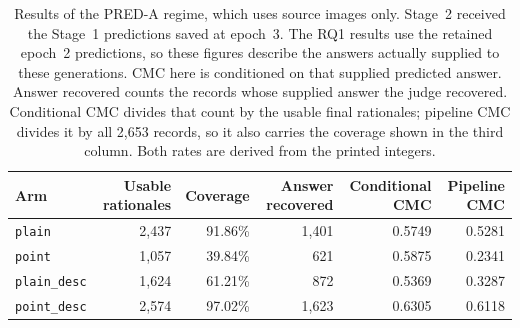 \begin{table}[ht]
\centering
\caption[Secondary predicted-answer regime]{Results of the PRED-A regime,
which uses source images only. Stage~2 received the Stage~1 predictions
saved at epoch~3. The RQ1 results use the retained epoch~2 predictions, so
these figures describe the answers actually supplied to these generations.
CMC here is conditioned on that supplied predicted answer. Answer recovered
counts the records whose supplied answer the judge recovered. Conditional
CMC divides that count by the usable final rationales; pipeline CMC divides
it by all 2,653 records, so it also carries the coverage shown in the third
column. Both rates are derived from the printed integers.}
\label{tab:pred-a-compact}
\begin{tabular}{lrrrrr}
\toprule
Arm & Usable rationales & Coverage & Answer recovered & Conditional CMC & Pipeline CMC \\
\midrule
\texttt{plain} & 2,437 & 91.86\% & 1,401 & 0.5749 & 0.5281 \\
\texttt{point} & 1,057 & 39.84\% & 621 & 0.5875 & 0.2341 \\
\texttt{plain\_desc} & 1,624 & 61.21\% & 872 & 0.5369 & 0.3287 \\
\texttt{point\_desc} & 2,574 & 97.02\% & 1,623 & 0.6305 & 0.6118 \\
\bottomrule
\end{tabular}
\end{table}
